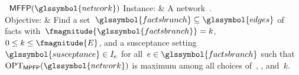 \begin{problem}[framed]{\MFFP~$\mffp(\glssymbol{network})$}%
    Instance:  & A network~.\\
    Objective: & Find a set~$\glssymbol{factsbranch}\subseteq\glssymbol{edges}$
    of \gls{facts} with~$\fmagnitude{\glssymbol{factsbranch}} = k$, $0\leq k\leq
    \fmagnitude{\edges}$, and a susceptance
    setting~$\glssymbol{susceptance}\in\interval_{\edge}$ for
    all~$\edge\in\glssymbol{factsbranch}$ such
    that~$\opt_{\mpfp}(\glssymbol{network})$ is maximum among all choices
    of~, , and~$k$.
\end{problem}%